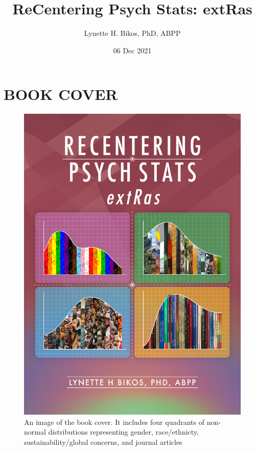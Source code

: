 \documentclass[
]{book}
\title{ReCentering Psych Stats: extRas}
\author{Lynette H. Bikos, PhD, ABPP}
\date{06 Dec 2021}
\begin{document}
\maketitle

{
\setcounter{tocdepth}{1}
\tableofcontents
}
\hypertarget{book-cover}{%
\chapter*{BOOK COVER}\label{book-cover}}

\begin{figure}
\centering
\includegraphics{images/ReCenterPsychStats-extRas-bookcover.png}
\caption{An image of the book cover. It includes four quadrants of non-normal distributions representing gender, race/ethnicty, sustainability/global concerns, and journal articles}
\end{figure}
\end{document}
